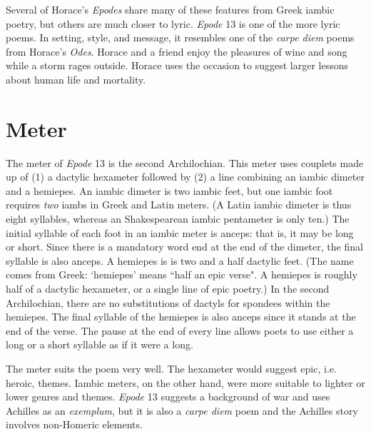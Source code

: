Several of Horace's \textit{Epodes} share many of these features from Greek iambic poetry, but others are much closer to lyric.  \textit{Epode} 13 is one of the more lyric poems.  In setting, style, and message, it resembles one of the \textit{carpe diem} poems from Horace's \textit{Odes}.  Horace and a friend enjoy the pleasures of wine and song while a storm rages outside.  Horace uses the occasion to suggest larger lessons about human life and mortality.


\section*{Meter}

The meter of \textit{Epode} 13 is the second Archilochian. This meter uses couplets made up of (1) a dactylic hexameter followed by (2) a line combining an iambic dimeter and a hemiepes.  An iambic dimeter is two iambic feet, but one iambic foot requires \textit{two} iambs in Greek and Latin meters.  (A Latin iambic dimeter is thus eight syllables, whereas an Shakespearean iambic pentameter is only ten.)  The initial syllable of each foot in an iambic meter is anceps: that is, it may be long or short.  Since there is a mandatory word end at the end of the dimeter, the final syllable is also anceps.  A hemiepes is is two and a half dactylic feet.  (The name comes from Greek: `hemiepes' means ``half an epic verse".  A hemiepes is roughly half of a dactylic hexameter, or a single line of epic poetry.)  In the second Archilochian, there are no substitutions of dactyls for spondees within the hemiepes.  The final syllable of the hemiepes is also anceps since it stands at the end of the verse.  The pause at the end of every line allows poets to use either a long or a short syllable as if it were a long.\newline

\indent\metra{\m\mbb\m\mbb\m\c\mbb\m\mbb\m\bb\m\mb}

\indent\indent\metra{\mb\m\b\m\mb\m\b\mb\cc\m\bb\m\bb\mb}\newline

The meter suits the poem very well.  The hexameter would suggest epic, i.e.  heroic, themes.  Iambic meters, on the other hand, were more suitable to lighter or lower genres and themes.  \textit{Epode} 13 suggests a background of war and uses Achilles as an \textit{exemplum}, but it is also a \textit{carpe diem} poem and the Achilles story involves non-Homeric elements.

